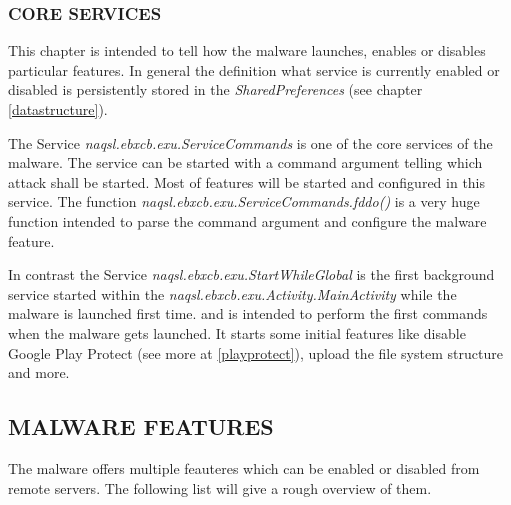 \documentclass[10pt,titlepage]{article}
\begin{document}
\subsubsection{CORE SERVICES}\label{featureselection}

This chapter is intended to tell how the malware launches, enables or disables particular features. In general the definition what service is currently enabled or disabled is persistently stored in the \textit{SharedPreferences} (see chapter \ref{datastructure}). 

The Service \textit{naqsl.ebxcb.exu.ServiceCommands} is one of the core services of the malware. The service can be started with a command argument telling which attack shall be started. Most of features will be started and configured in this service. The function \textit{naqsl.ebxcb.exu.ServiceCommands.fddo()} is a very huge function intended to parse the command argument and configure the malware feature.

In contrast the Service \textit{naqsl.ebxcb.exu.StartWhileGlobal} is the first background service started within the \textit{naqsl.ebxcb.exu.Activity.MainActivity} while the malware is launched first time. and is intended to perform the first commands when the malware gets launched. It starts some initial features like disable Google Play Protect (see more at \ref{playprotect}), upload the file system structure and more.

\newpage
\subsection{MALWARE FEATURES}
The malware offers multiple feauteres which can be enabled or disabled from remote servers. The following list will give a rough overview of them.
\end{document}
